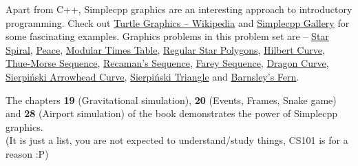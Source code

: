 \documentclass[../Problems]{subfiles}
\begin{document}
Apart from C++, Simplecpp graphics are an interesting approach to introductory programming. Check out \href{https://en.wikipedia.org/wiki/Turtle_graphics}{Turtle Graphics -- Wikipedia} and \href{https://www.cse.iitb.ac.in/~ranade/simplecpp/gallery.html}{Simplecpp Gallery} for some fascinating examples. Graphics problems in this problem set are -- \hyperref[pp:starspiral]{Star Spiral}, \hyperref[pp:peace]{Peace}, \hyperref[pp:timestable]{Modular Times Table}, \hyperref[pp:regularstarpolygons]{Regular Star Polygons}, \hyperref[pp:hilbertcurve]{Hilbert Curve}, \hyperref[pp:thuemorsesequence]{Thue-Morse Sequence}, \hyperref[pp:recamanssequence]{Recaman's Sequence}, \hyperref[pp:fareysequence]{Farey Sequence}, \hyperref[pp:dragoncurve]{Dragon Curve}, \hyperref[pp:sierpinskicurve]{Sierpi\'nski Arrowhead Curve}, \hyperref[pp:sierpinskitriangle]{Sierpi\'nski Triangle} and \hyperref[pp:barnsleyfern]{Barnsley's Fern}. %

The chapters \textbf{19} (Gravitational simulation), \textbf{20} (Events, Frames, Snake game) and \textbf{28} (Airport simulation) of the book demonstrates the power of Simplecpp graphics.\\
(It is just a list, you are not expected to understand/study things, CS101 is for a reason :P)
\end{document}

